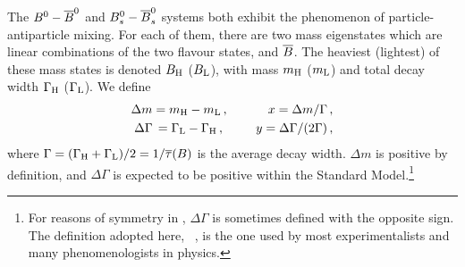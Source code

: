 The $\Bd-\Bdbar$ and $\Bs-\Bsbar$ systems
both exhibit the phenomenon of particle-antiparticle mixing. For each of them, 
there are two mass eigenstates which are linear combinations of the two flavour states,
\B and $\bar{\B}$. 
The heaviest (lightest) of these mass states is denoted
$B_{\rm H}$ ($B_{\rm L}$),
with mass $m_{\rm H}$ ($m_{\rm L}$)
and total decay width $\Gamma_{\rm H}$ ($\Gamma_{\rm L}$). We define
\begin{eqnarray}
\Delta m = m_{\rm H} - m_{\rm L} \,, &~~~~&  x = \Delta m/\Gamma \,, \labe{dm} \\
\Delta \Gamma \, = \Gamma_{\rm L} - \Gamma_{\rm H} \,, ~ &~~~~&  y= \Delta\Gamma/(2\Gamma) \,, \labe{dg}
\end{eqnarray}
where 
$\Gamma = (\Gamma_{\rm H} + \Gamma_{\rm L})/2 =1/\bar{\tau}(\B)$ 
is the average decay width.
$\Delta m$ is positive by definition, and 
$\Delta \Gamma$ is expected to be positive within
the Standard Model.\footnote{
  \label{foot:life_mix:Eqdg}
  For reasons of symmetry in , 
  $\Delta \Gamma$ is sometimes defined with the opposite sign. 
  The definition adopted here, \ie\
  , is the one used by most experimentalists and many
  phenomenologists in \B physics.}

